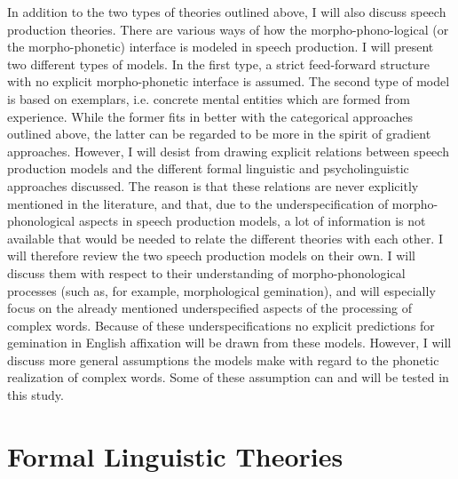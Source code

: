 In addition to the two types of theories outlined above, I will also discuss speech production theories. There are various ways of how the morpho-phono-logical (or the morpho-phonetic) interface is modeled in speech production.  
I will present two different types of models. In the first type, a strict feed-forward structure with no explicit morpho-phonetic interface is assumed. The second type of model is based on exemplars, i.e. concrete mental entities which are formed from experience. While the former fits in better with the categorical approaches outlined above, the latter can be regarded to be more in the spirit of gradient approaches. 
However, I will desist from drawing explicit relations between speech production models and the different formal linguistic and psycholinguistic approaches discussed. The reason is that these relations are never explicitly mentioned in the literature, and that, due to the underspecification of morpho-phonological aspects in speech production models, a lot of information is not available that would be needed to relate the different theories with each other.
I will therefore review the two speech production models on their own. I will discuss them with respect to their understanding of morpho-phonological processes (such as, for example, morphological gemination), and will especially focus on the already mentioned underspecified aspects of the processing of complex words.  Because of these underspecifications no explicit predictions for gemination in English affixation will be drawn from these models. However, I will discuss more general assumptions the models make with regard to the phonetic realization of complex words. Some of these assumption can and will be tested in this study.



\section{Formal Linguistic Theories} 


